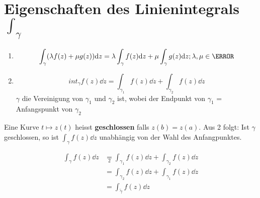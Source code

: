 \section{Eigenschaften des Linienintegrals \texorpdfstring{$\int_\gamma$}{}}
\begin{enumerate}
	\item \[ \int_\gamma (\lambda f(z) + \mu g(z) ) \dd z = \lambda \int_\gamma f(z) \dd z + \mu \int_\gamma g(z) \dd z ; \lambda ,\mu \in \C \]
	\item \[ int_\gamma f(z) \dd z = \int_{\gamma_1} f(z) \dd z + \int_{\gamma_2} f(z) \dd z \]
		$\gamma$ die Vereinigung von $\gamma_1$ und $\gamma_2$ ist, wobei der Endpunkt von $\gamma_1$ = Anfangspunkt von $\gamma_2$
\end{enumerate}
Eine Kurve $t \mapsto z(t)$ heisst \textbf{geschlossen} falls $z(b) = z(a)$. Aus 2 folgt: Ist $\gamma$ geschlossen, so ist $\int_\gamma f(z) \dd z$ unabhängig von der Wahl des Anfangpunktes. \\
\begin{bew}
	\[ \begin{split}
		\int_\gamma f(z) \dd z	&\underset{2}{=} \int_{\gamma_1} f(z) \dd z + \int_{\gamma_2} f(z) \dd z \\
							&= \int_{\gamma_2} f(z) \dd z + \int_{\gamma_1} f(z) \dd z \\
							&= \int_{\tilde{\gamma}} f(z) \dd z
	\end{split} \]
\end{bew}
